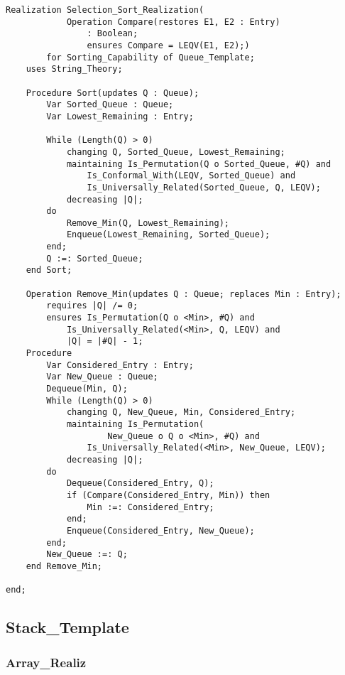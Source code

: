 \begin{lstlisting}[language=resolve]
Realization Selection_Sort_Realization(
			Operation Compare(restores E1, E2 : Entry) 
				: Boolean;
				ensures Compare = LEQV(E1, E2);)
		for Sorting_Capability of Queue_Template;
	uses String_Theory;

	Procedure Sort(updates Q : Queue);
		Var Sorted_Queue : Queue;
		Var Lowest_Remaining : Entry;

		While (Length(Q) > 0)
			changing Q, Sorted_Queue, Lowest_Remaining;
			maintaining Is_Permutation(Q o Sorted_Queue, #Q) and
				Is_Conformal_With(LEQV, Sorted_Queue) and 
				Is_Universally_Related(Sorted_Queue, Q, LEQV);
			decreasing |Q|;
		do
			Remove_Min(Q, Lowest_Remaining);
			Enqueue(Lowest_Remaining, Sorted_Queue);
		end;
		Q :=: Sorted_Queue;
	end Sort;

	Operation Remove_Min(updates Q : Queue; replaces Min : Entry);
		requires |Q| /= 0;
		ensures Is_Permutation(Q o <Min>, #Q) and
			Is_Universally_Related(<Min>, Q, LEQV) and
			|Q| = |#Q| - 1;
	Procedure
		Var Considered_Entry : Entry;
		Var New_Queue : Queue;
		Dequeue(Min, Q);		
		While (Length(Q) > 0)
			changing Q, New_Queue, Min, Considered_Entry;
			maintaining Is_Permutation(
					New_Queue o Q o <Min>, #Q) and
				Is_Universally_Related(<Min>, New_Queue, LEQV);
			decreasing |Q|;
		do
			Dequeue(Considered_Entry, Q);
			if (Compare(Considered_Entry, Min)) then
				Min :=: Considered_Entry;
			end;	
			Enqueue(Considered_Entry, New_Queue);
		end;
		New_Queue :=: Q;
	end Remove_Min;

end;
\end{lstlisting}

	\subsection{Stack\_Template}	%

		\subsubsection{Array\_Realiz}	%


